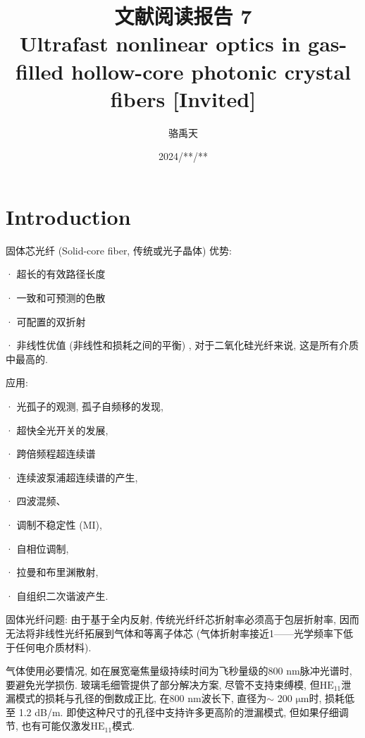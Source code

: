 \documentclass[14pt,a4paper,oneside]{article}
\title{\textbf{文献阅读报告 7\\Ultrafast nonlinear optics in gas-filled hollow-core photonic crystal fibers [Invited]}}                           %
\author{骆禹天}                                           %
\date{2024/**/**}                                        %
\numberwithin{equation}{subsection}             %
\numberwithin{figure}{subsection}               %
\begin{document}

\maketitle

\setcounter{page}{1}          %


\tableofcontents              %

\newpage
\setcounter{page}{1}          %








\section{Introduction}



固体芯光纤 (Solid-core fiber, 传统或光子晶体) 优势:

· 超长的有效路径长度

· 一致和可预测的色散

· 可配置的双折射

· 非线性优值 (非线性和损耗之间的平衡) , 对于二氧化硅光纤来说, 这是所有介质中最高的. 

应用:

· 光孤子的观测, 孤子自频移的发现, 

· 超快全光开关的发展, 

· 跨倍频程超连续谱

· 连续波泵浦超连续谱的产生, 

· 四波混频、

· 调制不稳定性 (MI),

· 自相位调制,

· 拉曼和布里渊散射,

· 自组织二次谐波产生.

固体光纤问题: 由于基于全内反射, 传统光纤纤芯折射率必须高于包层折射率, 因而无法将非线性光纤拓展到气体和等离子体芯 (气体折射率接近1——光学频率下低于任何电介质材料). 

气体使用必要情况, 如在展宽毫焦量级持续时间为飞秒量级的800 nm脉冲光谱时, 要避免光学损伤. 玻璃毛细管提供了部分解决方案, 尽管不支持束缚模, 但$\mathrm{HE_{11}}$泄漏模式的损耗与孔径的倒数成正比, 在800 nm波长下, 直径为$\sim$ 200 $\mathrm{\mu m}$时, 损耗低至 1.2 dB/m. 即使这种尺寸的孔径中支持许多更高阶的泄漏模式, 但如果仔细调节, 也有可能仅激发$\mathrm{HE_{11}}$模式. 
\end{document}
